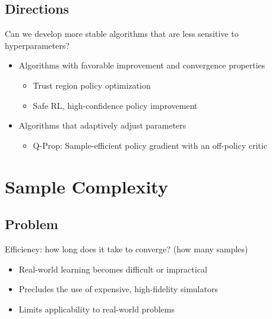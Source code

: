 \subsection{Directions}
Can we develop more stable algorithms that are less sensitive to hyperparameters?
\begin{itemize}
	\item Algorithms with favorable improvement and convergence properties
	\begin{itemize}
		\item Trust region policy optimization \cite{schulman2015icml}
		\item Safe \ac{RL}, high-confidence policy improvement
	\end{itemize}
	\item Algorithms that adaptively adjust parameters
	\begin{itemize}
		\item Q-Prop: Sample-efficient policy gradient with an off-policy critic \cite{gu2016q}
	\end{itemize}
\end{itemize}

\section{Sample Complexity}
\subsection{Problem}
Efficiency: how long does it take to converge? (how many samples)
\begin{itemize}
	\item Real-world learning becomes difficult or impractical
	\item Precludes the use of expensive, high-fidelity simulators
	\item Limits applicability to real-world problems
\end{itemize}
